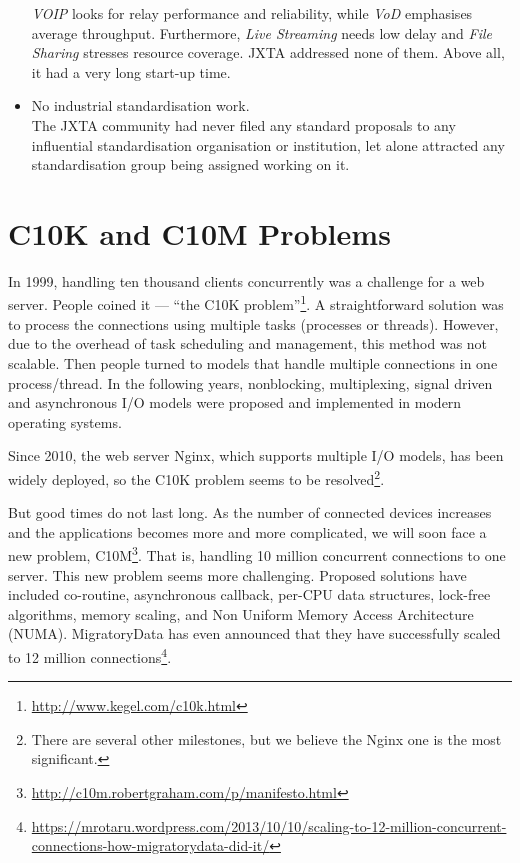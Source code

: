\begin{itemize}
	\textsl{VOIP} looks for relay performance and reliability, while \textsl{VoD} emphasises average throughput. Furthermore, \textsl{Live Streaming} needs low delay and \textsl{File Sharing} stresses resource coverage. JXTA addressed none of them. Above all, it had a very long start-up time. 
	\item No industrial standardisation work.\\
	The JXTA community had never filed any standard proposals to any influential standardisation organisation or institution, let alone attracted any standardisation group being assigned working on it. 
\end{itemize}
 

\section{C10K and C10M Problems}
In 1999, handling ten thousand clients concurrently  was a challenge for a web server. People coined it --- ``the C10K problem''\footnote{\url{http://www.kegel.com/c10k.html}}. A straightforward solution was to process the connections using multiple tasks (processes or threads). However, due to the overhead of task scheduling and management, this method was not scalable. Then people turned to models that handle multiple connections in one process/thread. In the following years, nonblocking, multiplexing, signal driven and asynchronous I/O models were proposed and implemented in modern operating systems. 

Since 2010, the web server Nginx, which supports multiple I/O models, has been widely deployed, so the C10K problem seems to be resolved\footnote{There are several other milestones, but we believe the Nginx one is the most significant.}. 

But good times do not last long. As the number of connected devices increases and the applications becomes more and more complicated, we will soon face a new problem, C10M\footnote{\url{http://c10m.robertgraham.com/p/manifesto.html}}. That is, handling 10 million concurrent connections to one server. This new problem seems more challenging. Proposed solutions have included co-routine, asynchronous callback, per-CPU data structures, lock-free algorithms, memory scaling, and Non Uniform Memory Access Architecture (NUMA). MigratoryData has even announced that they have successfully scaled to 12 million connections\footnote{\url{https://mrotaru.wordpress.com/2013/10/10/scaling-to-12-million-concurrent-connections-how-migratorydata-did-it/}}. 

